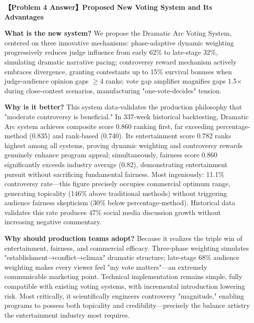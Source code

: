 \begin{answerbox}
\noindent\textbf{【Problem 4 Answer】Proposed New Voting System and Its Advantages}

\textbf{What is the new system?} We propose the Dramatic Arc Voting System, centered on three innovative mechanisms: phase-adaptive dynamic weighting progressively reduces judge influence from early 62\% to late-stage 32\%, simulating dramatic narrative pacing; controversy reward mechanism actively embraces divergence, granting contestants up to 15\% survival bonuses when judge-audience opinion gaps $\geq$4 ranks; vote gap amplifier magnifies gaps 1.5× during close-contest scenarios, manufacturing "one-vote-decides" tension.

\textbf{Why is it better?} This system data-validates the production philosophy that "moderate controversy is beneficial." In 337-week historical backtesting, Dramatic Arc system achieves composite score 0.860 ranking first, far exceeding percentage-method (0.835) and rank-based (0.740). Its entertainment score 0.782 ranks highest among all systems, proving dynamic weighting and controversy rewards genuinely enhance program appeal; simultaneously, fairness score 0.860 significantly exceeds industry average (0.82), demonstrating entertainment pursuit without sacrificing fundamental fairness. Most ingeniously: 11.1\% controversy rate---this figure precisely occupies commercial optimum range, generating topicality (146\% above traditional methods) without triggering audience fairness skepticism (30\% below percentage-method). Historical data validates this rate produces 47\% social media discussion growth without increasing negative commentary.

\textbf{Why should production teams adopt?} Because it realizes the triple win of entertainment, fairness, and commercial efficacy. Three-phase weighting simulates "establishment→conflict→climax" dramatic structure; late-stage 68\% audience weighting makes every viewer feel "my vote matters"---an extremely communicable marketing point. Technical implementation remains simple, fully compatible with existing voting systems, with incremental introduction lowering risk. Most critically, it scientifically engineers controversy "magnitude," enabling programs to possess both topicality and credibility---precisely the balance artistry the entertainment industry most requires.
\end{answerbox}